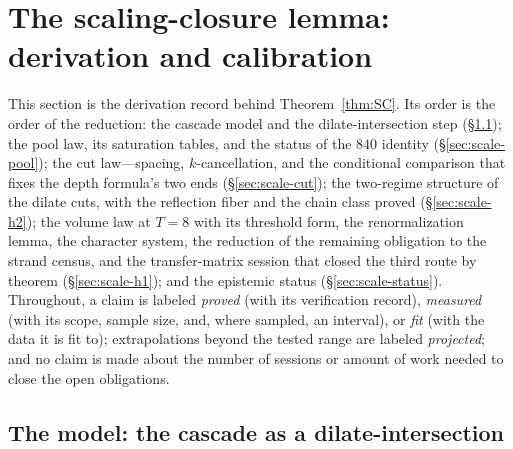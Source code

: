 
\section{The scaling-closure lemma: derivation and calibration}\label{sec:scale}

This section is the derivation record behind Theorem~\ref{thm:SC}. Its
order is the order of the reduction: the cascade model and the
dilate-intersection step (\S\ref{sec:scale-model}); the pool law, its
saturation tables, and the status of the $840$ identity
(\S\ref{sec:scale-pool}); the cut law---spacing, $k$-cancellation, and
the conditional comparison that fixes the depth formula's two ends
(\S\ref{sec:scale-cut}); the two-regime structure of the dilate cuts,
with the reflection fiber and the chain class proved
(\S\ref{sec:scale-h2}); the volume law at $T=8$ with its
threshold form, the renormalization lemma, the character system, the
reduction of the remaining obligation to the strand
census, and the transfer-matrix session that closed the third route by
theorem (\S\ref{sec:scale-h1}); and the epistemic status
(\S\ref{sec:scale-status}). Throughout, a claim is labeled
\emph{proved} (with its verification record), \emph{measured} (with its
scope, sample size, and, where sampled, an interval), or \emph{fit}
(with the data it is fit to); extrapolations beyond the tested range
are labeled \emph{projected}; and no claim is made about the number of
sessions or amount of work needed to close the open obligations.

\subsection{The model: the cascade as a dilate-intersection}\label{sec:scale-model}

